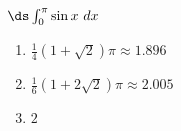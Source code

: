 {$\ds \int_{0}^{\pi} \sin x\ dx$}
{\begin{enumerate}
\item		$\frac14(1+\sqrt2)\pi\approx 1.896$
\item		$\frac1{6}(1+2\sqrt{2})\pi\approx 2.005$
\item		$2$
\end{enumerate}
}